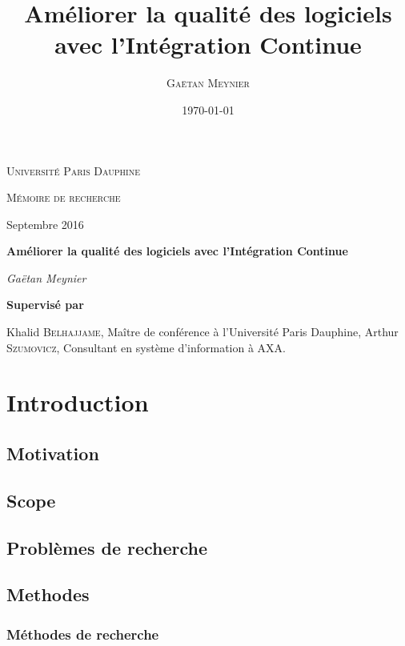 \documentclass{report}
\title{Améliorer la qualité des logiciels avec l'Intégration Continue}
\author{\textsc{Gaëtan Meynier}}
\date{\today}
\begin{document}
  \begin{titlepage}
    \centering
    {\scshape\LARGE Université Paris Dauphine \par}
    \vspace{1cm}
	  {\scshape\Large Mémoire de recherche\par}
    \vspace{0.5cm}
    Septembre 2016\par
    \vspace{4.5cm}
    {\huge\bfseries Améliorer la qualité des logiciels avec l'Intégration Continue\par}
    \vspace{2cm}
	  {\Large\itshape Gaëtan Meynier\par}
    \vspace{5cm}
	  \vfill
	    {\bfseries Supervisé par\par}
      \vspace{0.5cm}
	    Khalid \textsc{Belhajjame}, Maître de conférence à l'Université Paris Dauphine,
      Arthur \textsc{Szumovicz}, Consultant en système d'information à AXA.
	  \vfill
  \end{titlepage}

  \tableofcontents                %

  \chapter{Introduction}

    \section{Motivation}

    \section{Scope}

    \section{Problèmes de recherche}

    \section{Methodes}

      \subsection{Méthodes de recherche}
\end{document}
